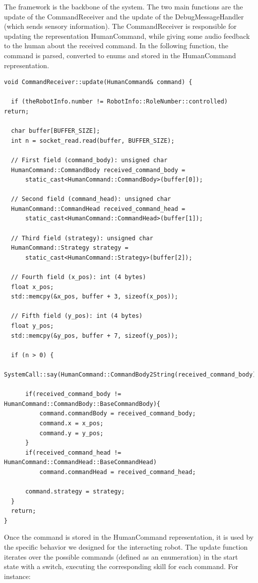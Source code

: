 \documentclass[a4paper, onecolumn, 12pt]{article}
\begin{document}
The framework is the backbone of the system. The two main functions are the
update of the CommandReceiver and the update of the DebugMessageHandler (which
sends sensory information). The CommandReceiver is responsible for updating the
representation HumanCommand, while giving some audio feedback to the human about
the received command. In the following function, the command is parsed,
converted to enums and stored in the HumanCommand representation. 

\begin{verbatim}
void CommandReceiver::update(HumanCommand& command) {
  
  if (theRobotInfo.number != RobotInfo::RoleNumber::controlled) return;
  
  char buffer[BUFFER_SIZE];
  int n = socket_read.read(buffer, BUFFER_SIZE);
  
  // First field (command_body): unsigned char
  HumanCommand::CommandBody received_command_body = 
      static_cast<HumanCommand::CommandBody>(buffer[0]);
  
  // Second field (command_head): unsigned char
  HumanCommand::CommandHead received_command_head = 
      static_cast<HumanCommand::CommandHead>(buffer[1]);
  
  // Third field (strategy): unsigned char
  HumanCommand::Strategy strategy = 
      static_cast<HumanCommand::Strategy>(buffer[2]);
  
  // Fourth field (x_pos): int (4 bytes)
  float x_pos;
  std::memcpy(&x_pos, buffer + 3, sizeof(x_pos));
  
  // Fifth field (y_pos): int (4 bytes)
  float y_pos;
  std::memcpy(&y_pos, buffer + 7, sizeof(y_pos));
  
  if (n > 0) {
      SystemCall::say(HumanCommand::CommandBody2String(received_command_body));
  
      if(received_command_body != HumanCommand::CommandBody::BaseCommandBody){
          command.commandBody = received_command_body;
          command.x = x_pos;
          command.y = y_pos;
      }
      if(received_command_head != HumanCommand::CommandHead::BaseCommandHead)
          command.commandHead = received_command_head;
  
      command.strategy = strategy;
  }
  return;
}
\end{verbatim}

Once the command is stored in the HumanCommand representation, it is used by the
specific behavior we designed for the interacting robot. The update function
iterates over the possible commands (defined as an enumeration) in the start
state with a switch, executing the corresponding skill for each command. For
instance:
\end{document}
